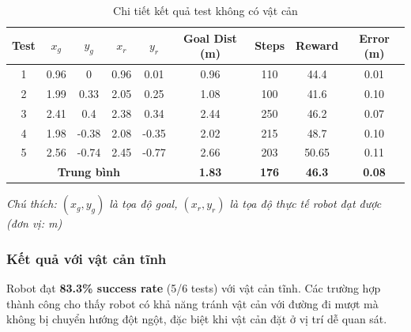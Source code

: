 \begin{table}[H]
\centering
\caption{Chi tiết kết quả test không có vật cản}
\label{tab:no_obstacle_results}
{
\begin{tabular}{c|cc|cc|c|c|c|c}
\hline
\textbf{Test} & \textbf{$x_g$} & \textbf{$y_g$} & \textbf{$x_r$} & \textbf{$y_r$} & \textbf{Goal Dist (m)} & \textbf{Steps} & \textbf{Reward} & \textbf{Error (m)} \\
\hline
1 & 0.96 & 0 & 0.96 & 0.01 & 0.96 & 110 & 44.4 & 0.01 \\
2 & 1.99 & 0.33 & 2.05 & 0.25 & 1.08 & 100 & 41.6 & 0.10 \\
3 & 2.41 & 0.4 & 2.38 & 0.34 & 2.44 & 250 & 46.2 & 0.07 \\
4 & 1.98 & -0.38 & 2.08 & -0.35 & 2.02 & 215 & 48.7 & 0.10 \\
5 & 2.56 & -0.74 & 2.45 & -0.77 & 2.66 & 203 & 50.65 & 0.11 \\
\hline
\multicolumn{5}{c|}{\textbf{Trung bình}} & \textbf{1.83} & \textbf{176} & \textbf{46.3} & \textbf{0.08} \\
\hline
\end{tabular}
}
\end{table}

\textit{Chú thích: $(x_g, y_g)$ là tọa độ goal, $(x_r, y_r)$ là tọa độ thực tế robot đạt được (đơn vị: m)}

\subsubsection{Kết quả với vật cản tĩnh}

Robot đạt \textbf{83.3\% success rate} (5/6 tests) với vật cản tĩnh. Các trường hợp thành công cho thấy robot có khả năng tránh vật cản với đường đi mượt mà không bị chuyển hướng đột ngột, đặc biệt khi vật cản đặt ở vị trí dễ quan sát.

